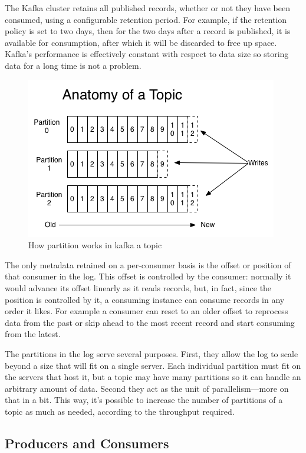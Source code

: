 The Kafka cluster retains all published records, whether or not they have been consumed, using a configurable retention period. For example, if the retention policy is set to two days, then for the two days after a record is published, it is available for consumption, after which it will be discarded to free up space. Kafka's performance is effectively constant with respect to data size so storing data for a long time is not a problem.

\begin{figure}[h]
    \centering
    \includegraphics[width=0.7\linewidth]{Figures/log_anatomy}
    \caption[How partition works in kafka a topic]{How partition works in kafka a topic}
    \label{fig:loganatomy}
\end{figure}

The only metadata retained on a per-consumer basis is the offset or position of that consumer in the log. This offset is controlled by the consumer: normally it would advance its offset linearly as it reads records, but, in fact, since the position is controlled by it, a consuming instance can consume records in any order it likes. For example a consumer can reset to an older offset to reprocess data from the past or skip ahead to the most recent record and start consuming from the latest.

The partitions in the log serve several purposes. First, they allow the log to scale beyond a size that will fit on a single server. Each individual partition must fit on the servers that host it, but a topic may have many partitions so it can handle an arbitrary amount of data. Second they act as the unit of parallelism—more on that in a bit. This way, it's possible to increase the number of partitions of a topic as much as needed, according to the throughput required.

\subsection{Producers and Consumers}

